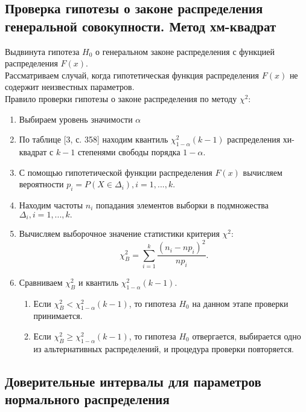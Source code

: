 \subsection {Проверка гипотезы о законе распределения генеральной совокупности. Метод хм-квадрат}
	Выдвинута гипотеза $H_0$ о генеральном законе распределения с функцией распределения $F(x)$.\\
	Рассматриваем случай, когда гипотетическая функция распределения $F(x)$ не содержит неизвестных параметров.\\
	Правило проверки гипотезы о законе распределения по методу $\chi^2$:\\
	\begin{enumerate}
		\item {Выбираем уровень значимости $\alpha$}
		\item {По таблице [3, с. 358] находим квантиль $\chi^2_{1 - \alpha}(k - 1)$ распределения хи-квадрат с  $k - 1$ степенями свободы порядка $1 - \alpha$.}
		\item {С помощью гипотетической функции распределения $F(x)$ вычисляем вероятности $p_i = P(X\in \Delta_i), i = 1, ..., k$.}
		\item {Находим частоты $n_i$ попадания элементов выборки в подмножества $\Delta_i, i = 1, ..., k.$}
		\item {Вычисляем выборочное значение статистики критерия $\chi^2$:\\
			$$\chi^2_B = \sum_{i=1}^k\frac{(n_i - np_i)^2}{np_i}.$$}
		\item {
		Сравниваем $\chi^2_B$ и квантиль $\chi^2_{1 - \alpha}(k - 1)$.\\
		\begin{enumerate}
			\item {Если $\chi^2_B < \chi^2_{1 - \alpha}(k - 1)$, то гипотеза $H_0$ на данном этапе проверки принимается.}
			\item {Если $\chi^2_B \geq \chi^2_{1 - \alpha}(k - 1)$, то гипотеза $H_0$ отвергается, выбирается одно из альтернативных распределений, и процедура проверки повторяется.}
		\end{enumerate}}
	\end{enumerate}

\subsection {Доверительные интервалы для параметров нормального распределения}
